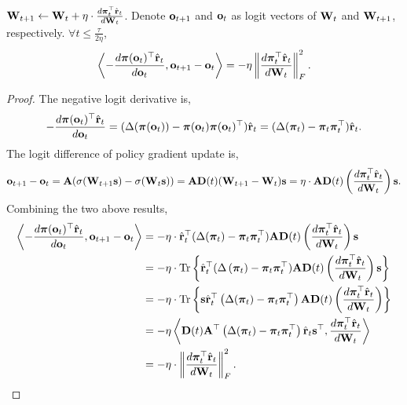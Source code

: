 \begin{lem}
\label{lem:inner_product_logit_difference_logit_derivative}
    ${\mathbf{W}}_{t+1} \gets {\mathbf{W}}_t + \eta \cdot \frac{d {\boldsymbol{\pi}}_t^\top \hat{{\mathbf{r}}}_t}{d {\mathbf{W}}_t}$. Denote ${\mathbf{o}}_{t+1}$ and ${\mathbf{o}}_t$ as logit vectors of ${\mathbf{W}}_t$ and ${\mathbf{W}}_{t+1}$, respectively. $\forall t \le \frac{\tau}{ 2 \eta }$,
\begin{equation*}
\begin{split}
    \left\langle - \frac{d {\boldsymbol{\pi}}( {\mathbf{o}}_t )^\top \hat{{\mathbf{r}}}_t}{d {\mathbf{o}}_t}, {\mathbf{o}}_{t+1} - {\mathbf{o}}_t \right\rangle = - \eta \left\| \frac{d {\boldsymbol{\pi}}_t^\top \hat{{\mathbf{r}}}_t}{d {\mathbf{W}}_t} \right\|_F^2.
\end{split}
\end{equation*}
\end{lem}
\begin{proof}
    The negative logit derivative is,
\begin{equation*}
\begin{split}
    - \frac{d {\boldsymbol{\pi}}( {\mathbf{o}}_t )^\top \hat{{\mathbf{r}}}_t}{d {\mathbf{o}}_t} = ( \Delta( {\boldsymbol{\pi}}( {\mathbf{o}}_t ) ) - {\boldsymbol{\pi}}( {\mathbf{o}}_t ) {\boldsymbol{\pi}}( {\mathbf{o}}_t )^\top ) \hat{{\mathbf{r}}}_t = (\Delta( {\boldsymbol{\pi}}_t ) - {\boldsymbol{\pi}}_t {\boldsymbol{\pi}}_t^\top ) \hat{{\mathbf{r}}}_t.
\end{split}
\end{equation*}
The logit difference of policy gradient update is,
\begin{equation*}
\begin{split}
    {\mathbf{o}}_{t+1} - {\mathbf{o}}_t = {\mathbf{A}} ( \sigma({\mathbf{W}}_{t+1} {\mathbf{s}} ) - \sigma( {\mathbf{W}}_t {\mathbf{s}} ) ) = {\mathbf{A}} {\mathbf{D}}(t) ( {\mathbf{W}}_{t+1} - {\mathbf{W}}_t ) {\mathbf{s}} = \eta \cdot {\mathbf{A}} {\mathbf{D}}(t) \left( \frac{d {\boldsymbol{\pi}}_t^\top \hat{{\mathbf{r}}}_t}{d {\mathbf{W}}_t} \right) {\mathbf{s}}.
\end{split}
\end{equation*}
Combining the two above results,
\begin{equation*}
\begin{split}
    \left\langle - \frac{d {\boldsymbol{\pi}}( {\mathbf{o}}_t )^\top \hat{{\mathbf{r}}}_t}{d {\mathbf{o}}_t}, {\mathbf{o}}_{t+1} - {\mathbf{o}}_t \right\rangle &= - \eta \cdot \hat{{\mathbf{r}}}_t^\top ( \Delta( {\boldsymbol{\pi}}_t ) - {\boldsymbol{\pi}}_t {\boldsymbol{\pi}}_t^\top ) {\mathbf{A}} {\mathbf{D}}(t) \left( \frac{d {\boldsymbol{\pi}}_t^\top \hat{{\mathbf{r}}}_t}{d {\mathbf{W}}_t} \right) {\mathbf{s}} \\
    &= - \eta \cdot \operatorname*{Tr} \left\{ \hat{{\mathbf{r}}}_t^\top ( \Delta\left( {\boldsymbol{\pi}}_t \right) - {\boldsymbol{\pi}}_t {\boldsymbol{\pi}}_t^\top ) {\mathbf{A}} {\mathbf{D}}(t) \left( \frac{d {\boldsymbol{\pi}}_t^\top \hat{{\mathbf{r}}}_t}{d {\mathbf{W}}_t} \right) {\mathbf{s}} \right\} \\
    &= - \eta \cdot \operatorname*{Tr} \left\{ {\mathbf{s}} \hat{{\mathbf{r}}}_t^\top \left( \Delta( {\boldsymbol{\pi}}_t ) - {\boldsymbol{\pi}}_t {\boldsymbol{\pi}}_t^\top \right) {\mathbf{A}} {\mathbf{D}}(t) \left( \frac{d {\boldsymbol{\pi}}_t^\top \hat{{\mathbf{r}}}_t}{d {\mathbf{W}}_t} \right)  \right\} \\
    &= - \eta \left\langle {\mathbf{D}}(t) {\mathbf{A}}^\top \left( \Delta( {\boldsymbol{\pi}}_t ) - {\boldsymbol{\pi}}_t {\boldsymbol{\pi}}_t^\top \right) \hat{{\mathbf{r}}}_t {\mathbf{s}}^\top, \frac{d {\boldsymbol{\pi}}_t^\top \hat{{\mathbf{r}}}_t}{d {\mathbf{W}}_t} \right\rangle \\
    &= - \eta \cdot \left\| \frac{d {\boldsymbol{\pi}}_t^\top \hat{{\mathbf{r}}}_t}{d {\mathbf{W}}_t} \right\|_F^2. \qedhere
\end{split}
\end{equation*}
\end{proof}

